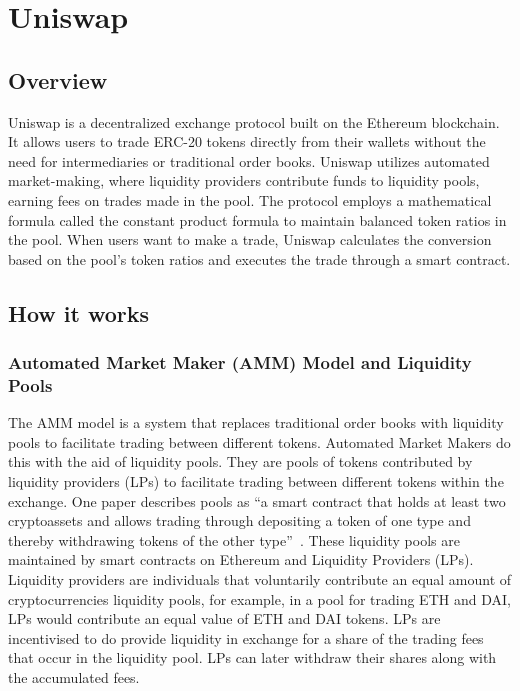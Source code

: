\chapter{Uniswap}

\section{Overview}
Uniswap is a decentralized exchange protocol built on the Ethereum blockchain. It allows users to trade ERC-20 tokens directly from their wallets without the need for intermediaries or traditional order books. Uniswap utilizes automated market-making, where liquidity providers contribute funds to liquidity pools, earning fees on trades made in the pool. The protocol employs a mathematical formula called the constant product formula to maintain balanced token ratios in the pool. When users want to make a trade, Uniswap calculates the conversion based on the pool's token ratios and executes the trade through a smart contract.

\section{How it works}
\subsection{Automated Market Maker (AMM) Model and Liquidity Pools}
The AMM model is a system that replaces traditional order books with liquidity pools to facilitate trading between different tokens. Automated Market Makers do this with the aid of liquidity pools. They are pools of tokens contributed by liquidity providers (LPs) to facilitate trading between different tokens within the exchange. One paper describes pools as ``a smart contract that holds at least two cryptoassets and allows trading through depositing a token of one type and thereby withdrawing tokens of the other type''~\cite{schar2021decentralized}. These liquidity pools are maintained by smart contracts on Ethereum and Liquidity Providers (LPs). Liquidity providers are individuals that voluntarily contribute an equal amount of cryptocurrencies liquidity pools, for example, in a pool for trading ETH and DAI, LPs would contribute an equal value of ETH and DAI tokens. LPs are incentivised to do provide liquidity in exchange for a share of the trading fees that occur in the liquidity pool. LPs can later withdraw their shares along with the accumulated fees.

